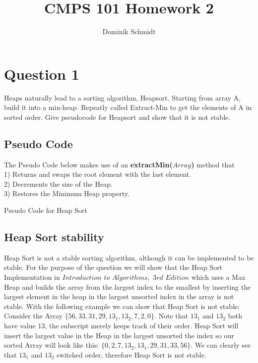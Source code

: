 \documentclass{article}
\title{CMPS 101 Homework 2}
\author{Dominik Schmidt}
\begin{document}
\maketitle

\section*{Question 1}
Heaps naturally lead to a sorting algorithm, Heapsort. Starting
from array A, build it into a min-heap. Repeatly called Extract-Min
to get the elements of A in sorted order. Give pseudocode for Heapsort
and show that it is not stable.\\

\subsection*{Pseudo Code}
The Pseudo Code below makes use of an \textbf{extractMin($Array$)} method that \\
1) Returns and swaps the root element with the last element. \\
2) Decrements the size of the Heap. \\
3) Restores the Minimum Heap property.

\begin{algorithm}
\begin{algorithmic}
	\ENDFOR
\end{algorithmic}
\caption{Pseudo Code for Heap Sort}
\end{algorithm}

\subsection*{Heap Sort stability}
Heap Sort is not a stable sorting algorithm, although it can be 
implemented to be stable. For the purpose of the question we will show
that the Heap Sort Implementation in $Introduction$ $to$ $Algorithms,$ $3rd$
$Edition$ which uses a Max Heap and builds the array from the largest index to 
the smallest by inserting the largest element in the heap in the largest unsorted
index in the array is not stable. With the following example we can show that
Heap Sort is not stable: Consider the  Array ${\{56, 33, 31, 29, 13_1, 13_2, 7, 2, 0\}}$. 
Note that $13_1$ and $13_2$ both have value 13, the subscript merely
keeps track of their order. Heap Sort will insert the largest value in the Heap 
in the largest unsorted the index so our sorted Array will look like this: 
 ${\{ 0,2,7,13_2,13_1,29,31,33,56\}}$. We can clearly see that $13_1$ and 
$13_2$ switched order, therefore Heap Sort is not stable.
\end{document}
